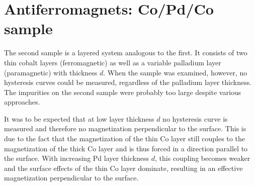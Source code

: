 
\section{Antiferromagnets: Co/Pd/Co sample}
\label{sec:antiferromagnet}



The second sample is a layered system analogous to the first. It consists of two thin cobalt layers (ferromagnetic) as well as a variable palladium layer (paramagnetic) with thickness $d$. 
When the sample was examined, however, no hysteresis curves could be measured, regardless of the palladium layer thickness. 
The impurities on the second sample were probably too large despite various approaches.

It was to be expected that at low layer thickness $d$ no hysteresis curve is measured and therefore no magnetization perpendicular to the surface. 
This is due to the fact that the magnetization of the thin Co layer still couples to the magnetization of the thick Co layer and is thus forced in a direction parallel to the surface. 
With increasing Pd layer thickness $d$, this coupling becomes weaker and the surface effects of the thin Co layer dominate, resulting in an effective magnetization perpendicular to the surface.
